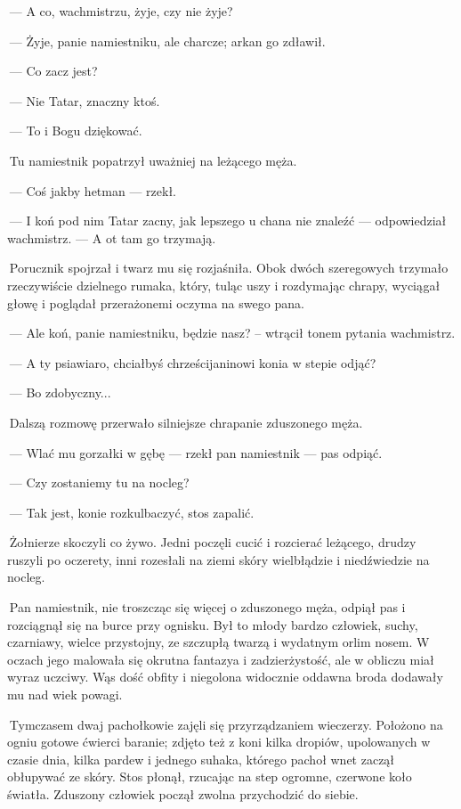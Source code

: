  — A co, wachmistrzu, żyje, czy nie żyje?

 — Żyje, panie namiestniku, ale charcze; arkan go zdławił.

 — Co zacz jest?

 — Nie Tatar, znaczny ktoś.

 — To i Bogu dziękować.

 Tu namiestnik popatrzył uważniej na leżącego męża.

 — Coś jakby hetman — rzekł.

 — I koń pod nim Tatar zacny, jak lepszego u chana nie znaleźć — odpowiedział wachmistrz. — A ot tam go trzymają.

 Porucznik spojrzał i twarz mu się rozjaśniła. Obok dwóch szeregowych trzymało rzeczywiście dzielnego rumaka, który, tuląc uszy i rozdymając chrapy, wyciągał głowę i poglądał przerażonemi oczyma na swego pana.

 — Ale koń, panie namiestniku, będzie nasz? – wtrącił tonem pytania wachmistrz.

 — A ty psiawiaro, chciałbyś chrześcijaninowi konia w stepie odjąć?

 — Bo zdobyczny...

 Dalszą rozmowę przerwało silniejsze chrapanie zduszonego męża.

 — Wlać mu gorzałki w gębę — rzekł pan namiestnik — pas odpiąć.

 — Czy zostaniemy tu na nocleg?

 — Tak jest, konie rozkulbaczyć, stos zapalić.

 Żołnierze skoczyli co żywo. Jedni poczęli cucić i rozcierać leżącego, drudzy ruszyli po oczerety, inni rozesłali na ziemi skóry wielbłądzie i niedźwiedzie na nocleg.

 Pan namiestnik, nie troszcząc się więcej o zduszonego męża, odpiął pas i rozciągnął się na burce przy ognisku. Był to młody bardzo człowiek, suchy, czarniawy, wielce przystojny, ze szczupłą twarzą i wydatnym orlim nosem. W oczach jego malowała się okrutna fantazya i zadzierżystość, ale w obliczu miał wyraz uczciwy. Wąs dość obfity i niegolona widocznie oddawna broda dodawały mu nad wiek powagi.

 Tymczasem dwaj pachołkowie zajęli się przyrządzaniem wieczerzy. Położono na ogniu gotowe ćwierci baranie; zdjęto też z koni kilka dropiów, upolowanych w czasie dnia, kilka pardew i jednego suhaka, którego pachoł wnet zaczął obłupywać ze skóry. Stos płonął, rzucając na step ogromne, czerwone koło światła. Zduszony człowiek począł zwolna przychodzić do siebie.

